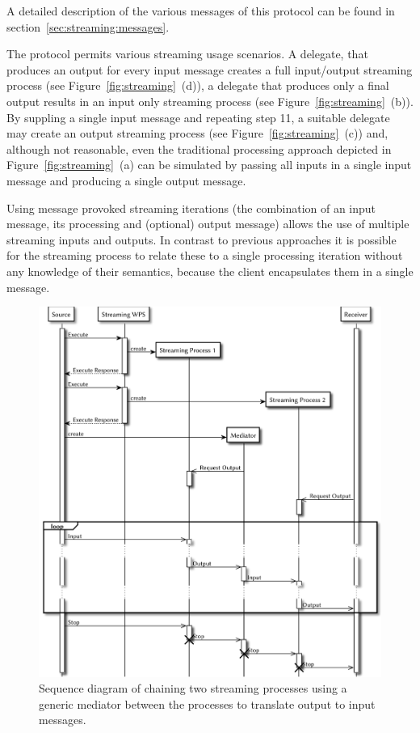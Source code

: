 	A detailed description of the various messages of this protocol can be found in section~\ref{sec:streaming:messages}.

	The protocol permits various streaming usage scenarios. A delegate, that produces an output for every input message creates a full input/output streaming process (see Figure~\ref{fig:streaming}~(d)), a delegate that produces only a final output results in an input only streaming process (see Figure~\ref{fig:streaming}~(b)). By suppling a single input message and repeating step 11, a suitable delegate may create an output streaming process (see Figure~\ref{fig:streaming}~(c)) and, although not reasonable, even the traditional processing approach depicted in Figure~\ref{fig:streaming}~(a) can be simulated by passing all inputs in a single input message and producing a single output message.

	Using message provoked streaming iterations (the combination of an input message, its processing and (optional) output message) allows the use of multiple streaming inputs and outputs. In contrast to previous approaches it is possible for the streaming process to relate these to a single processing iteration without any knowledge of their semantics, because the client encapsulates them in a single message.

	\begin{figure}[!htb]
		\centering
		\includegraphics[width=1\textwidth]{figures/sequence-diagramm-chain.pdf}
		\caption{\label{fig:sd:chain}Sequence diagram of chaining two streaming processes using a generic mediator between the processes to translate output to input messages.}
	\end{figure}

